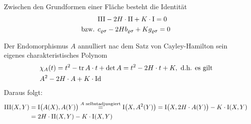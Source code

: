 \begin{satz}\label{satz232}
 Zwischen den Grundformen einer Fläche besteht die Identität
 \begin{align*}
  &\Rom3 - 2 H \cdot \Rom2 + K \cdot \Rom1 = 0 \\
  \text{bzw. } & c_{\varrho \sigma} - 2 H b_{\varrho \sigma} + K g_{\varrho \sigma} = 0
 \end{align*}

\end{satz}

\begin{beweis}
 Der Endomorphismus \(A\) annulliert nac dem Satz von Cayley-Hamilton sein eigenes charakteristisches Polynom 
 \begin{align*}
  &\chi_A(t) = t^2 - \operatorname{tr} A \cdot t + \det A = t^2 - 2H \cdot t + K, \text{ d.h. es gilt} \\
  &A^2 - 2H \cdot A + K \cdot \operatorname{Id}
 \end{align*}
 Daraus folgt:
 \begin{align*}
  \Rom3(X,Y) &= \Rom1 \big(A(X),A(Y)\big) \stackrel{A \text{ selbstadjungiert}}{=} \Rom1\big(X, A^2(Y)\big) = \Rom1 \big(X,2H \cdot A(Y)\big) - K \cdot \Rom1(X,Y) \\
  &=2H \cdot \Rom2(X,Y) - K \cdot \Rom1(X,Y)
 \end{align*}

\end{beweis}


